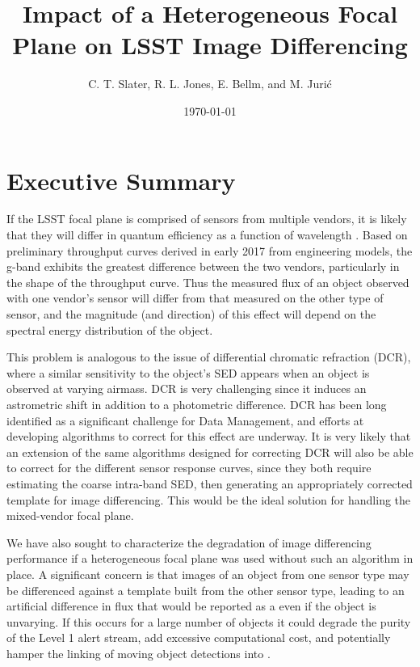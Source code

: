 \documentclass[DM,toc]{lsstdoc}
\title[Heterogeneous Focal Plane]{Impact of a Heterogeneous Focal Plane on LSST Image Differencing}
\author{C. T. Slater, R. L. Jones, E. Bellm, and M. Juri\'c}
\date{\today}
\begin{document}
\maketitle

\section{Executive Summary}

If the LSST focal plane is comprised of sensors from multiple vendors, it is
likely that they will differ in quantum efficiency as a function of wavelength .
Based on preliminary throughput curves derived in early 2017 from engineering
models, the g-band exhibits the greatest difference between the two vendors,
particularly in the shape of the throughput curve. Thus the measured flux of an
object observed with one vendor's sensor will differ from that measured on the
other type of sensor, and the magnitude (and direction) of this effect will
depend on the spectral energy distribution of the object.

This problem is analogous to the issue of differential chromatic refraction (DCR),
where a similar sensitivity to the object's SED appears when an object is
observed at varying airmass. DCR is very challenging since it induces an
astrometric shift in addition to a photometric difference. DCR has been long
identified as a significant challenge for Data Management, and efforts at
developing algorithms to correct for this effect are underway. It is very likely
that an extension of the same algorithms designed for correcting DCR will also
be able to correct for the different sensor response curves, since they both
require estimating the coarse intra-band SED, then generating an appropriately
corrected template for image differencing. This would be the ideal solution for
handling the mixed-vendor focal plane.

We have also sought to characterize the degradation of image differencing
performance if a heterogeneous focal plane was used without such an algorithm in place.
A significant concern is that images of an object from one sensor type may be
differenced against a template built from the other sensor type, leading to an
artificial difference in flux that would be reported as a \DIASource even if the
object is unvarying. If this occurs for a large number of objects it could
degrade the purity of the Level 1 alert stream, add excessive computational
cost, and potentially hamper the linking of moving object detections into
\SSObjects.
\end{document}
